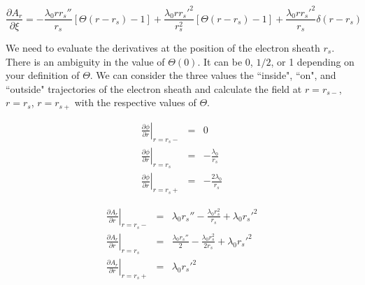 \documentclass[aps,prl,preprint,groupedaddress]{revtex4-1}
\begin{document}
\begin{equation}\label{dA_r}
\frac{\partial A_r}{\partial \xi} = -\frac{\lambda_0 r r_s''}{r_s}\left[\Theta(r-r_s)-1\right] + \frac{\lambda_0 r r_s'^2}{r_s^2}\left[\Theta(r-r_s)-1\right] + \frac{\lambda_0 r r_s'^2}{r_s}\delta(r-r_s)
\end{equation}

%



We need to evaluate the derivatives at the position of the electron sheath $r_s$. There is an ambiguity in the value of $\Theta(0)$. It can be 0, $1/2$, or 1 depending on your definition of $\Theta$. We can consider the three values the ``inside", ``on", and ``outside" trajectories of the electron sheath and calculate the field at $r=r_{s-}$,  $r=r_{s}$,  $r=r_{s+}$ with the respective values of $\Theta$.

\begin{equation}\label{eq:dphi_all}
\begin{array}{lcl}
\left.\frac{\partial \phi}{\partial r} \right|_{r=r_s-} & = & 0 \\
\left.\frac{\partial \phi}{\partial r} \right|_{r=r_s} & = & -\frac{\lambda_0}{r_s} \\
\left.\frac{\partial \phi}{\partial r} \right|_{r=r_s+} & = & -\frac{2\lambda_0}{r_s}
\end{array}
\end{equation}

\begin{equation}\label{eq:dA_r_all}
\begin{array}{lcl}
\left.\frac{\partial A_r}{\partial r} \right|_{r=r_s-} & = & \lambda_0 r_s'' - \frac{\lambda_0 r_s^2}{r_s} + \lambda_0 r_s'^2 \\
\left.\frac{\partial A_r}{\partial r} \right|_{r=r_s} & = & \frac{\lambda_0 r_s''}{2} - \frac{\lambda_0 r_s^2}{2 r_s} + \lambda_0 r_s'^2\\
\left.\frac{\partial A_r}{\partial r} \right|_{r=r_s+} & = & \lambda_0 r_s'^2
\end{array}
\end{equation}
\end{document}

